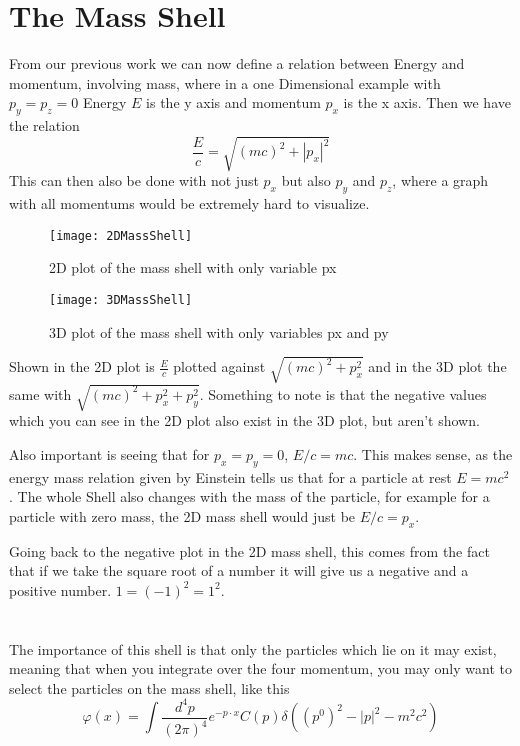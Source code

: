 \documentclass[]{scrartcl}
\begin{document}
\newpage
\section{The Mass Shell}

From our previous work we can now define a relation between Energy and momentum, involving mass, where in a one Dimensional example with $p_y = p_z = 0$ Energy $E$ is the y axis and momentum $p_x$ is the x axis. Then we have the relation
\begin{equation}
	\frac{E}{c} = \sqrt{(mc)^2 + |p_x|^2}
\end{equation}
This can then also be done with not just $p_x$ but also $p_y$ and $p_z$, where a graph with all momentums would be extremely hard to visualize.

\begin{figure}[h]
	\centering
	\texttt{[image: 2DMassShell]}
	\caption{2D plot of the mass shell with only variable px}
\end{figure}\newpage
\begin{figure}[H]
	\centering
	\texttt{[image: 3DMassShell]}
	\caption{3D plot of the mass shell with only variables px and py}
\end{figure}
\newpage
Shown in the 2D plot is $\frac{E}{c}$ plotted against $\sqrt{(mc)^2 + p_x^2}$ and in the 3D plot the same with $\sqrt{(mc)^2 + p_x^2 + p_y^2}$. Something to note is that the negative values which you can see in the 2D plot also exist in the 3D plot, but aren't shown.

Also important is seeing that for $p_x = p_y = 0$, $E/c = mc$. This makes sense, as the energy mass relation given by Einstein tells us that for a particle at rest $E = mc^2$. The whole Shell also changes with the mass of the particle, for example for a particle with zero mass, the 2D mass shell would just be $E/c = p_x$.

Going back to the negative plot in the 2D mass shell, this comes from the fact that if we take the square root of a number it will give us a negative and a positive number. $1 = (-1)^2 = 1^2$.\\\\\\
The importance of this shell is that only the particles which lie on it may exist, meaning that when you integrate over the four momentum, you may only want to select the particles on the mass shell, like this
\begin{equation}
	\varphi(x) = \int \frac{d^4p}{(2\pi)^4}e^{-p\cdot x}C(p)\delta\left((p^0)^2 - |p|^2 - m^2c^2\right)
\end{equation}
\end{document}
